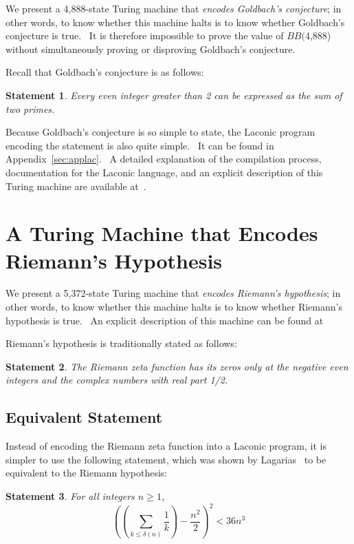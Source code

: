 \documentclass[11pt]{article}
\newtheorem{statement}{Statement}
\newcommand{\gbstatenumstate}{4,888-state }
\newcommand{\bbgbstatenum}{$BB($4,888) }
\newcommand{\rmstatenumstate}{5,372-state }
\begin{document}
We present a \gbstatenumstate Turing machine that \emph{encodes Goldbach's conjecture}; in other words, to know whether this machine halts is to know whether Goldbach's conjecture is true. \ It is therefore impossible to prove the value of \bbgbstatenum without simultaneously proving or disproving Goldbach's conjecture.

Recall that Goldbach's conjecture is as follows:

\begin{statement}
\emph{Every even integer greater than 2 can be expressed as the sum of two primes.}
\label{goldbachstatement}
\end{statement}

Because Goldbach's conjecture is so simple to state, the Laconic program encoding the statement is also quite simple. \ It can be found in Appendix~\ref{sec:applac}. \ A detailed explanation of the compilation process, documentation for the Laconic language, and an explicit description of this Turing machine are available at~\cite{github}.

\section{A Turing Machine that Encodes Riemann's Hypothesis}

We present a \rmstatenumstate Turing machine that \emph{encodes Riemann's hypothesis}; in other words, to know whether this machine halts is to know whether Riemann's hypothesis is true. \ An explicit description of this machine can be found at~\cite{github}

Riemann's hypothesis is traditionally stated as follows:

\begin{statement}
\emph{The Riemann zeta function has its zeros only at the negative even integers and the complex numbers with real part 1/2.}
\label{goldbachstatement}
\end{statement}

\subsection{Equivalent Statement}

Instead of encoding the Riemann zeta function into a Laconic program, it is simpler to use the following statement, which was shown by Lagarias~\cite{riemann} to be equivalent to the Riemann hypothesis:

\begin{statement} \label{eq:riemann}
For all integers $n \ge 1$,
$$\left(\left(\sum_{k \le \delta(n)} \frac{1}{k}\right) - \frac{n^2}{2}\right)^2 < 36n^3$$
\end{statement}
\end{document}
